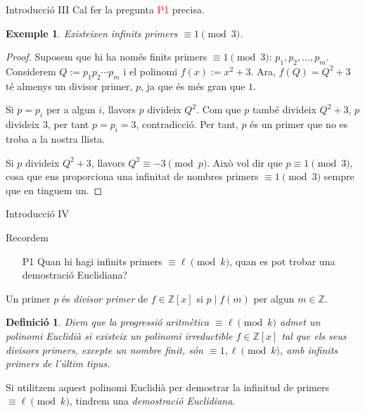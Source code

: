 \documentclass[11pt]{beamer}
\newtheorem{exem}{Exemple}
\newtheorem{defin}{Definició}
\newcommand{\Z}{\ensuremath{\mathbb{Z}}}
\begin{document}
	\begin{frame}{Introducció III}
	Cal fer la pregunta \textcolor{red}{P1} precisa.\pause
	\begin{exem}
		Existeixen infinits primers $\equiv 1 \pmod{3}$.	
	\end{exem}\pause
	\begin{proof}
		Suposem que hi ha només finits primers $\equiv 1 \pmod{3}$: $p_1, p_2, \dots, p_m$. Considerem $Q := p_1 p_2 \cdots p_m$ i el polinomi $f(x) := x^2 + 3$. Ara, $f(Q) = Q^2 + 3$ té almenys un divisor primer, $p$, ja que és més gran que $1$.\pause
		
		Si $p = p_i$ per a algun $i$, llavors $p$ divideix $Q^2$. Com que $p$ també divideix $Q^2 + 3$, $p$ divideix $3$, per tant $p = p_i = 3$, contradicció. Per tant, $p$ és un primer que no es troba a la nostra llista.\pause
		
		Si $p$ divideix $Q^2 + 3$, llavors $Q^2 \equiv -3 \pmod{p}$. Això vol dir que $p \equiv 1 \pmod{3}$, cosa que ens proporciona una infinitat de nombres primers $\equiv 1 \pmod{3}$ sempre que en tinguem un.
	\end{proof}
\end{frame}
			
	\begin{frame}{Introducció IV}
		\begin{alertblock}{Recordem}
			\begin{itemize}
				\item[P1] Quan hi hagi infinits primers $\equiv\ell\pmod{k}$, quan es pot trobar una demostració Euclidiana? \pause
			\end{itemize}
		\end{alertblock}
		Un primer $p$ és \emph{divisor primer} de $f\in\Z[x]$ si $p\mid f(m)$ per algun $m\in\Z$.\pause
	\begin{defin}
		Diem que la progressió aritmètica $\equiv \ell\pmod{k}$ {\normalfont admet un polinomi Euclidià} si existeix un polinomi irreductible $f\in \Z[x]$ tal que els seus divisors primers, excepte un nombre finit, són $\equiv 1,\ell\pmod{k}$, amb infinits primers de l'últim tipus.
	\end{defin}
	\pause
	Si utilitzem aquest polinomi Euclidià per demostrar la infinitud de primers $\equiv\ell\pmod{k}$, tindrem una \emph{demostració Euclidiana}.
\end{frame}
	
\end{document}
